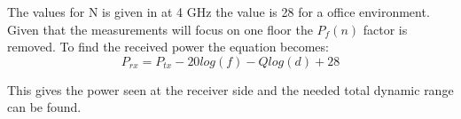 \begin{where}
\end{where}

The values for N is given in \citep{ITU_indoor} at 4 GHz the value is 28 for a office environment. Given that the measurements will focus on one floor the $P_f(n)$ factor is removed. To find the received power the equation becomes:
\begin{equation}
P_{rx} = P_{tx} - 20log(f) - Q log (d) +28
\label{total_prx}
\end{equation}
\begin{where}
\end{where}
This gives the power seen at the receiver side and the needed  total dynamic range can be found.

